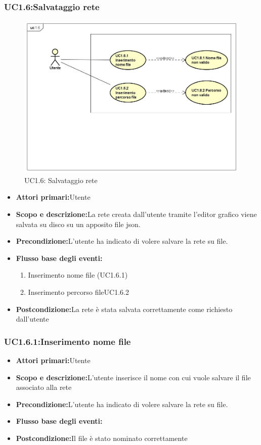 \subsubsection{UC1.6:Salvataggio rete}
\begin{figure} [H]
	\centering
	\includegraphics[scale=0.45]{Img/UC1-6}
	\caption{UC1.6: Salvataggio rete}\label{}
\end{figure}
\begin{itemize}
	\item{\textbf{Attori primari:}Utente}
	\item{\textbf{Scopo e descrizione:}La rete creata dall'utente tramite l'editor grafico viene salvata su disco su un apposito file json.}
	\item{\textbf{Precondizione:}L'utente ha indicato di volere salvare la rete su file.}
	\item{\textbf{Flusso base degli eventi:}}
	\begin{enumerate}
		\item{Inserimento nome file (UC1.6.1)}
		\item{Inserimento percorso file{UC1.6.2}}
	\end{enumerate}
	\item{\textbf{Postcondizione:}La rete è stata salvata correttamente come richiesto dall'utente}
\end{itemize}
\subsubsection{UC1.6.1:Inserimento nome file}
\begin{itemize}
	\item{\textbf{Attori primari:}Utente}
	\item{\textbf{Scopo e descrizione:}L'utente inserisce il nome con cui vuole salvare il file associato alla rete}
	\item{\textbf{Precondizione:}L'utente ha indicato di volere salvare la rete su file.}
	\item{\textbf{Flusso base degli eventi:}}
	\item{\textbf{Postcondizione:}Il file è stato nominato correttamente}
\end{itemize}
